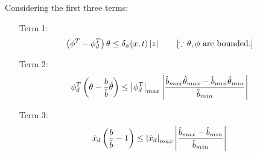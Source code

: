 Considering the first three terms:
\begin{enumerate}
    \item[Term 1:]
        \begin{align}
            \left( \phi^T - \phi_d^T \right) \theta &\leq \delta_\phi (x, t) \left\lvert z \right\rvert \qquad \left[ \because \theta, \phi \text{ are bounded.}  \right]
        \end{align}

    \item[Term 2:]
    \begin{align}
        \phi_d^T \left(  \theta - \frac{b}{\hat b} \hat \theta \right) &\leq \left\lvert \phi_d^T \right\rvert_{max} \left\lvert \frac{\hat b_{max} \hat \theta_{max} - \hat b_{min} \hat \theta_{min}}{\hat b_{min} } \right\rvert
    \end{align}

    \item[Term 3:]
    \begin{align}
        \dot x_d \left( \frac{b}{\hat b} - 1 \right)  &\leq \left\lvert \dot x_d \right\rvert_{max} \left\lvert \frac{\hat b_{max} - \hat b_{min}}{\hat b_{min}} \right\rvert
    \end{align}
\end{enumerate}
